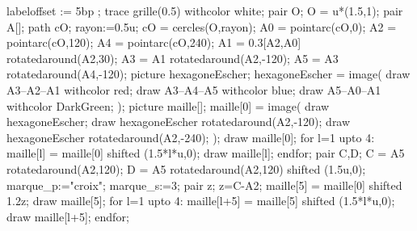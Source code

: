 \begin{exercice*}
\begin{changemargin}{-5mm}{0mm}
\begin{enumerate}
\begin{itemize}
            \end{itemize}
            \hspace*{-7mm}
            \begin{Geometrie}[CoinHD={(9u,4u)}]
                labeloffset := 5bp ;
                trace grille(0.5) withcolor white;
                pair O;
                O = u*(1.5,1);
                pair A[];
                path cO;
                rayon:=0.5u;
                cO = cercles(O,rayon);
                A0 = pointarc(cO,0);
                A2 = pointarc(cO,120);
                A4 = pointarc(cO,240);
                A1 = 0.3[A2,A0] rotatedaround(A2,30);
                A3 = A1 rotatedaround(A2,-120);
                A5 = A3 rotatedaround(A4,-120);        
                picture hexagoneEscher;
                hexagoneEscher = image(
                    draw A3--A2--A1 withcolor red;        
                        draw A3--A4--A5 withcolor blue;        
                        draw A5--A0--A1 withcolor DarkGreen;
                );
                picture maille[];
                maille[0] = image(
                    draw hexagoneEscher;
                    draw hexagoneEscher rotatedaround(A2,-120);
                    draw hexagoneEscher rotatedaround(A2,-240);
                );        
                draw maille[0];
                for l=1 upto 4:
                    maille[l] = maille[0] shifted (1.5*l*u,0);
                    draw maille[l];
                endfor;
                pair C,D;
                C = A5 rotatedaround(A2,120);
                D = A5 rotatedaround(A2,120) shifted (1.5u,0);
                marque_p:="croix";
                marque_s:=3;
                pair z;
                z=C-A2;
                maille[5] = maille[0] shifted 1.2z;
                draw maille[5];
                for l=1 upto 4:
                    maille[l+5] = maille[5] shifted (1.5*l*u,0);
                        draw maille[l+5];
                endfor;            
            \end{Geometrie}
        \end{enumerate}
    \end{changemargin}
\end{exercice*}
